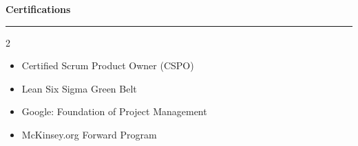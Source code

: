 \documentclass[9pt,letterpaper]{article} %
\newenvironment{rSection}[1]{ %
  \sectionskip
 \textbf{\Large #1} %
  \sectionlineskip
  \hrule %
  \begin{list}{}{ %
    \setlength{\leftmargin}{-0em} %
  }
  \item[]
}{
  \end{list}
}
\def\sectionlineskip{\smallskip} %
\def\sectionskip{} %
\begin{document}
\begin{rSection}{Certifications}
\begin{multicols}{2}
\begin{itemize}[left=-1.5em, labelsep=.1cm, labelwidth=.2cm, itemsep=0.0em, topsep=0pt]
\item Certified Scrum Product Owner (CSPO)
\item Lean Six Sigma Green Belt
\item Google: Foundation of Project Management
\item McKinsey.org Forward Program
\end{itemize}
\end{multicols}
\end{rSection}
\end{document}
